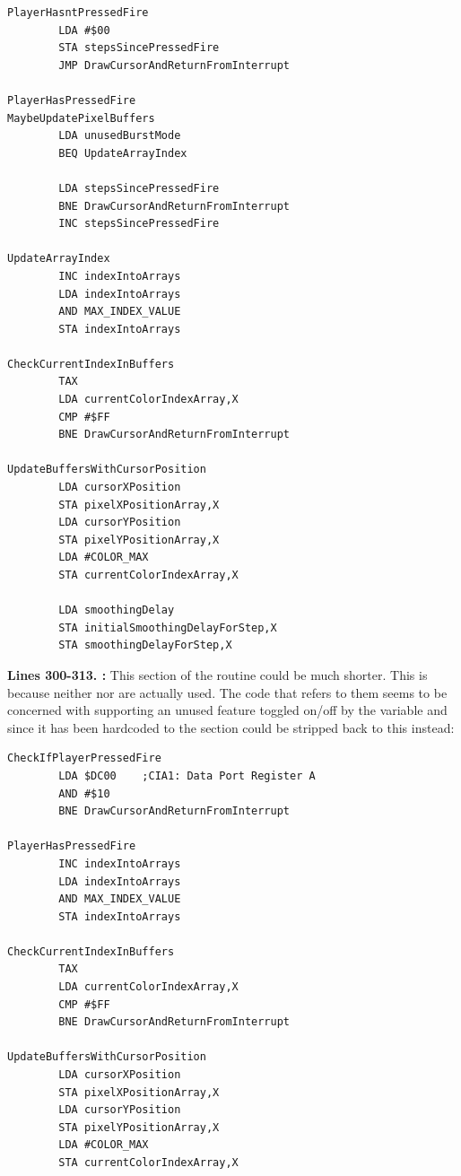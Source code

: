 {\begin{lstlisting}[caption= Third part of the Interrupt Handler.]
PlayerHasntPressedFire
        LDA #$00
        STA stepsSincePressedFire
        JMP DrawCursorAndReturnFromInterrupt

PlayerHasPressedFire
MaybeUpdatePixelBuffers   
        LDA unusedBurstMode
        BEQ UpdateArrayIndex

        LDA stepsSincePressedFire
        BNE DrawCursorAndReturnFromInterrupt
        INC stepsSincePressedFire

UpdateArrayIndex   
        INC indexIntoArrays
        LDA indexIntoArrays
        AND MAX_INDEX_VALUE
        STA indexIntoArrays

CheckCurrentIndexInBuffers  
        TAX 
        LDA currentColorIndexArray,X
        CMP #$FF
        BNE DrawCursorAndReturnFromInterrupt

UpdateBuffersWithCursorPosition
        LDA cursorXPosition
        STA pixelXPositionArray,X
        LDA cursorYPosition
        STA pixelYPositionArray,X
        LDA #COLOR_MAX
        STA currentColorIndexArray,X

        LDA smoothingDelay
        STA initialSmoothingDelayForStep,X
        STA smoothingDelayForStep,X

\end{lstlisting}
\clearpage

\textbf{Lines 300-313. :} This section of the routine could be much shorter. This
is because neither  nor  are actually used. The code that refers
to them seems to be concerned with supporting an unused feature toggled on/off by the variable 
and since it has been hardcoded to  the section could be stripped back to this instead:

\begin{lstlisting}[basicstyle=\ttfamily\scriptsize]
CheckIfPlayerPressedFire   
        LDA $DC00    ;CIA1: Data Port Register A
        AND #$10
        BNE DrawCursorAndReturnFromInterrupt

PlayerHasPressedFire
        INC indexIntoArrays
        LDA indexIntoArrays
        AND MAX_INDEX_VALUE
        STA indexIntoArrays

CheckCurrentIndexInBuffers  
        TAX 
        LDA currentColorIndexArray,X
        CMP #$FF
        BNE DrawCursorAndReturnFromInterrupt

UpdateBuffersWithCursorPosition
        LDA cursorXPosition
        STA pixelXPositionArray,X
        LDA cursorYPosition
        STA pixelYPositionArray,X
        LDA #COLOR_MAX
        STA currentColorIndexArray,X


\end{lstlisting}}
